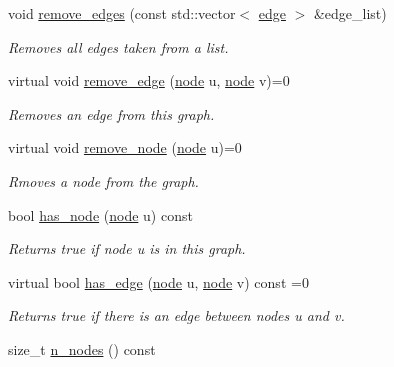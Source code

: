 \begin{DoxyCompactItemize}
void \hyperlink{classlgraph_1_1xxgraph_aef7c4bf62f3f4db362b2d3accb3b6d3d}{remove\+\_\+edges} (const std\+::vector$<$ \hyperlink{namespacelgraph_a76bd7d50719f03de7a85db259d80d572}{edge} $>$ \&edge\+\_\+list)
\begin{DoxyCompactList}\small\item\em Removes all edges taken from a list. \end{DoxyCompactList}\item 
virtual void \hyperlink{classlgraph_1_1xxgraph_a7fd3a1309cde4f408c8d9d4cb3b898a8}{remove\+\_\+edge} (\hyperlink{namespacelgraph_a397169dd66adf725210a30fb7251773e}{node} u, \hyperlink{namespacelgraph_a397169dd66adf725210a30fb7251773e}{node} v)=0
\begin{DoxyCompactList}\small\item\em Removes an edge from this graph. \end{DoxyCompactList}\item 
virtual void \hyperlink{classlgraph_1_1xxgraph_a5b9e033f38a3ab34734be61aa9344c84}{remove\+\_\+node} (\hyperlink{namespacelgraph_a397169dd66adf725210a30fb7251773e}{node} u)=0
\begin{DoxyCompactList}\small\item\em Rmoves a node from the graph. \end{DoxyCompactList}\item 
\mbox{\label{classlgraph_1_1xxgraph_a24645831355480e05f8e7ba75a5348c8}} 
bool \hyperlink{classlgraph_1_1xxgraph_a24645831355480e05f8e7ba75a5348c8}{has\+\_\+node} (\hyperlink{namespacelgraph_a397169dd66adf725210a30fb7251773e}{node} u) const
\begin{DoxyCompactList}\small\item\em Returns true if node {\itshape u} is in this graph. \end{DoxyCompactList}\item 
virtual bool \hyperlink{classlgraph_1_1xxgraph_a4e36e9722df020df6ba1dc47b7d9d830}{has\+\_\+edge} (\hyperlink{namespacelgraph_a397169dd66adf725210a30fb7251773e}{node} u, \hyperlink{namespacelgraph_a397169dd66adf725210a30fb7251773e}{node} v) const =0
\begin{DoxyCompactList}\small\item\em Returns true if there is an edge between nodes {\itshape u} and {\itshape v}. \end{DoxyCompactList}\item 
size\+\_\+t \hyperlink{classlgraph_1_1xxgraph_a67f651617ada4053b569102b9a54cab0}{n\+\_\+nodes} () const

\end{DoxyCompactItemize}
